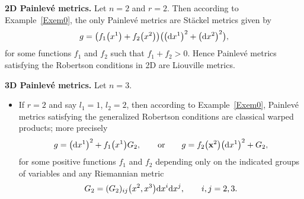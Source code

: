 \documentclass[pdftex]{sigma}
\numberwithin{equation}{section}
\begin{document}
\textbf{2D Painlev\'e metrics.} Let $n = 2$ and $r=2$. Then according to Example~\ref{Exem0}, the only Painlev\'e metrics are St\"ackel metrics given by
\begin{gather*} %
 g = \big( f_1\big(x^1\big) + f_2\big(x^2\big) \big) \big( \big({\rm d}x^1\big)^2 + \big({\rm d}x^2\big)^2 \big),
\end{gather*}
for some functions $f_1$ and $f_2$ such that $f_1 + f_2 > 0$. Hence Painlev\'e metrics satisfying the Robertson conditions in 2D are Liouville metrics.

\textbf{3D Painlev\'e metrics.} Let $n = 3$.
\begin{itemize}\itemsep=0pt
\item If $r=2$ and say $l_1= 1$, $l_2 = 2$, then according to Example~\ref{Exem0}, Painlev\'e metrics satisfying the generalized Robertson conditions are classical warped products; more precisely
\begin{gather*} %
 g = \big({\rm d}x^1\big)^2 + f_1\big(x^1\big) G_{2}, \qquad \textrm{or} \qquad g = f_2\big(\textbf{x}^2\big) \big({\rm d}x^1\big)^2 + G_2,
\end{gather*}
for some positive functions $f_1$ and $f_{2}$ depending only on the indicated groups of variables and any Riemannian metric
\[
 G_{2} = (G_{2})_{ij}\big(x^2,x^3\big) {\rm d}x^i {\rm d}x^j, \qquad i,j=2,3.
\]	


\end{itemize}
\end{document}
